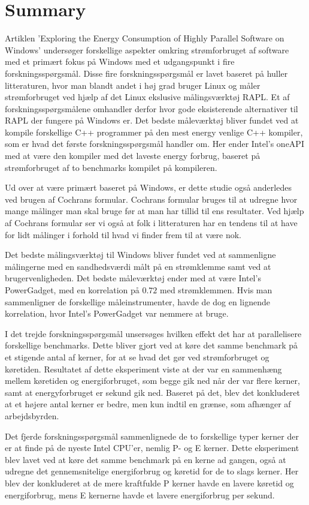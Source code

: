\section*{Summary}

Artiklen 'Exploring the Energy Consumption of Highly Parallel Software on Windows' undersøger forskellige aspekter omkring strømforbruget af software med et primært fokus på Windows med et udgangspunkt i fire forskningsspørgsmål. Disse fire forskningsspørgsmål er lavet baseret på huller litteraturen, hvor man blandt andet i høj grad bruger Linux og måler strømforbruget ved hjælp af det Linux ekslusive målingsværktøj RAPL. Et af forskningsspørgsmålene omhandler derfor hvor gode eksisterende alternativer til RAPL der fungere på Windows er. Det bedste måleværktøj bliver fundet ved at kompile forskellige C++ programmer på den mest energy venlige C++ kompiler, som er hvad det første forskningsspørgsmål handler om. Her ender Intel's oneAPI med at være den kompiler med det laveste energy forbrug, baseret på strømforbruget af to benchmarks kompilet på kompileren.

Ud over at være primært baseret på Windows, er dette studie også anderledes ved brugen af Cochrans formular. Cochrans formular bruges til at udregne hvor mange målinger man skal bruge før at man har tillid til ens resultater. Ved hjælp af Cochrans formular ser vi også at folk i litteraturen har en tendens til at have for lidt målinger i forhold til hvad vi finder frem til at være nok.

Det bedste målingsværktøj til Windows bliver fundet ved at sammenligne målingerne med en sandhedsværdi målt på en strømklemme samt ved at brugervenligheden. Det bedste måleværktøj ender med at være Intel's PowerGadget, med en korrelation på $0.72$ med strømklemmen. Hvis man sammenligner de forskellige måleinstrumenter, havde de dog en lignende korrelation, hvor Intel's PowerGadget var nemmere at bruge. 

I det trejde forskningsspørgsmål unsersøges hvilken effekt det har at parallelisere forskellige benchmarks. Dette bliver gjort ved at køre det samme benchmark på et stigende antal af kerner, for at se hvad det gør ved strømforbruget og køretiden. Resultatet af dette eksperiment viste at der var en sammenhæng mellem køretiden og energiforbruget, som begge gik ned når der var flere kerner, samt at energyforbruget er sekund gik ned. Baseret på det, blev det konkluderet at et højere antal kerner er bedre, men kun indtil en grænse, som afhænger af arbejdsbyrden.

Det fjerde forskningsspørgsmål sammenlignede de to forskellige typer kerner der er at finde på de nyeste Intel CPU'er, nemlig P- og E kerner. Dette eksperiment blev lavet ved at køre det samme benchmark på en kerne ad gangen, også at udregne det gennemsnitelige energiforbrug og køretid for de to slags kerner. Her blev der konkluderet at de mere kraftfulde P kerner havde en lavere køretid og energiforbrug, mens E kernerne havde et lavere energiforbrug per sekund.


